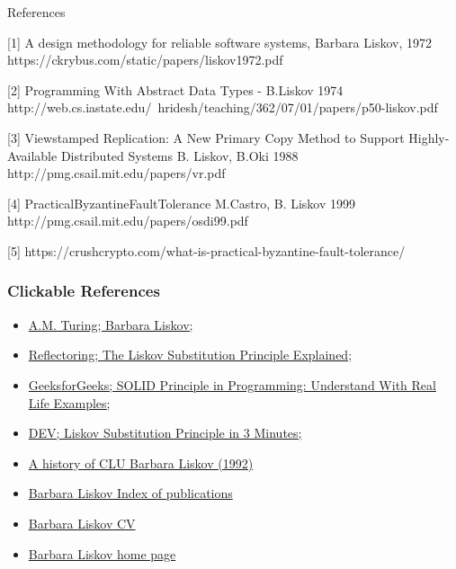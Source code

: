 \documentclass{beamer}
\begin{document}
\begin{frame}{References}

[1] {A  design  methodology  for  reliable  software   systems, Barbara Liskov, 1972} https://ckrybus.com/static/papers/liskov1972.pdf 

\vspace{1mm}

[2] {Programming With Abstract Data Types - B.Liskov 1974}
http://web.cs.iastate.edu/~hridesh/teaching/362/07/01/papers/p50-liskov.pdf

\vspace{1mm}

[3] {Viewstamped Replication: A New Primary Copy Method to Support Highly-Available Distributed Systems B. Liskov, B.Oki 1988}
http://pmg.csail.mit.edu/papers/vr.pdf

\vspace{1mm}

[4] {PracticalByzantineFaultTolerance M.Castro, B. Liskov 1999} http://pmg.csail.mit.edu/papers/osdi99.pdf

\vspace{1mm}

[5] https://crushcrypto.com/what-is-practical-byzantine-fault-tolerance/

\end{frame}

\begin{frame}
\frametitle{Clickable References}
\begin{itemize}
\item \href{https://amturing.acm.org/award_winners/liskov_1108679.cfm}{ A.M. Turing; Barbara Liskov;} 

\item \href{https://reflectoring.io/lsp-explained/}{ Reflectoring; The Liskov Substitution Principle Explained;}

\item \href{https://www.geeksforgeeks.org/solid-principle-in-programming-understand-with-real-life-e}{GeeksforGeeks; SOLID Principle in Programming: Understand With Real Life Examples;}


\item \href{https://dev.to/erikwhiting88/liskov-substitution-principle-in-3-minutes-2}{DEV; Liskov Substitution Principle in 3 Minutes;}
\item \href {https://dl.acm.org/doi/abs/10.1145/155360.155367}{A history of CLU Barbara Liskov (1992)}
\item \href{https://dblp.uni-trier.de/pid/l/BarbaraLiskov.html}{Barbara Liskov Index of publications}

\item \href{http://www.pmg.csail.mit.edu/~liskov/newcv-09.pdf}{Barbara Liskov CV}

\item \href{http://www.pmg.csail.mit.edu/~liskov/}{Barbara Liskov home page}

\end{itemize}
\end{frame}
\end{document}
